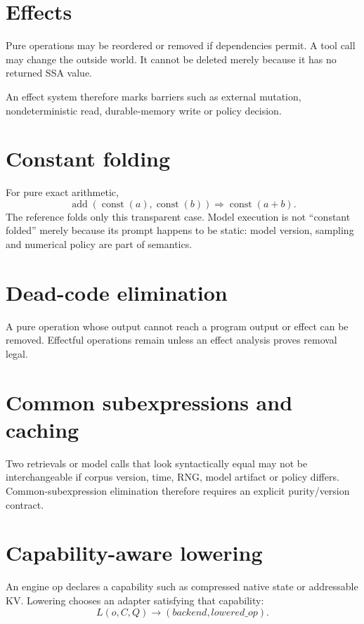 \section{Effects}
Pure operations may be reordered or removed if dependencies permit. A tool call may change the outside world. It cannot be deleted merely because it has no returned SSA value.

An effect system therefore marks barriers such as external mutation, nondeterministic read, durable-memory write or policy decision.

\section{Constant folding}
For pure exact arithmetic,
\[
\operatorname{add}(\operatorname{const}(a),\operatorname{const}(b))
\Rightarrow\operatorname{const}(a+b).
\]
The reference folds only this transparent case. Model execution is not ``constant folded'' merely because its prompt happens to be static: model version, sampling and numerical policy are part of semantics.

\section{Dead-code elimination}
A pure operation whose output cannot reach a program output or effect can be removed. Effectful operations remain unless an effect analysis proves removal legal.

\section{Common subexpressions and caching}
Two retrievals or model calls that look syntactically equal may not be interchangeable if corpus version, time, RNG, model artifact or policy differs. Common-subexpression elimination therefore requires an explicit purity/version contract.

\section{Capability-aware lowering}
An engine op declares a capability such as compressed native state or addressable KV. Lowering chooses an adapter satisfying that capability:
\[
L(o,C,Q)\rightarrow (backend,lowered\_op).
\]

